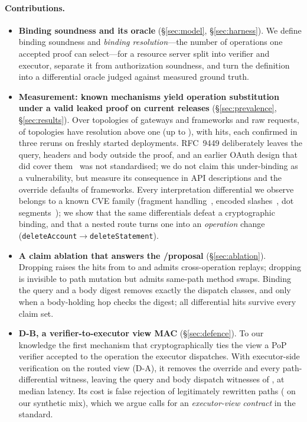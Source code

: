 \paragraph{Contributions.}
\begin{itemize}[leftmargin=*,itemsep=1pt,topsep=2pt]
\item \textbf{Binding soundness and its oracle} (\S\ref{sec:model},
\S\ref{sec:harness}). We define binding soundness and \emph{binding
resolution}---the number of operations one accepted proof can select---for a
resource server split into verifier and executor, separate it from
authorization soundness, and turn the definition into a differential oracle
judged against measured ground truth.
\item \textbf{Measurement: known mechanisms yield operation substitution
under a valid leaked proof on current releases} (\S\ref{sec:prevalence},
\S\ref{sec:results}). Over \NumTopologiesAll{} topologies of \NumGateways{}
gateways and \NumFrameworks{} frameworks and \NumCasesAll{} raw requests,
\NumVulnTopologies{} of \NumTopologies{} topologies have resolution above
one (up to \MaxResolution{}), with \NumHits{} hits, each confirmed in three
reruns on freshly started deployments. RFC~9449 deliberately leaves the query, headers and body outside
the proof, and an earlier OAuth design that did cover
them~\cite{p2:richer2016signedhttp} was not standardised; we do not claim
this under-binding as a vulnerability, but measure its consequence in
\NumSpecs{} API descriptions and the override defaults of
\NumTargetFrameworks{} frameworks. Every interpretation differential we
observe belongs to a known CVE family (fragment handling~\cite{p2:istio2021_008},
encoded slashes~\cite{p2:envoy2021_29492,p2:apisix2026_124680}, dot
segments~\cite{traefik2026cve40912,p2:envoy2026_73551}); we show that the
same differentials defeat a cryptographic binding, and that a nested route
turns one into an \emph{operation} change (\texttt{deleteAccount}$\to$\texttt{deleteStatement}).
\item \textbf{A claim ablation that answers the \htm/\htu proposal}
(\S\ref{sec:ablation}). Dropping \htu raises the hits from
\AblOneHitsFull{} to \AblOneHitsNoHtu{} and admits \AblOneSwapNoHtu{}
cross-operation replays; dropping \htm is invisible to path mutation but
admits \AblOneSwapNoHtm{} same-path method swaps. Binding the query and a
body digest removes exactly the dispatch classes, and only when a
body-holding hop checks the digest; all \AblOneGTwoSurvive{} differential
hits survive every claim set.
\item \textbf{D-B, a verifier-to-executor view MAC} (\S\ref{sec:defence}).
To our knowledge the first mechanism that cryptographically ties the view a
PoP verifier accepted to the operation the executor dispatches. With
executor-side verification on the routed view (D-A), it removes the
override and every path-differential witness, leaving the
\NumDefResidualDB{} query and body dispatch witnesses of \NumDefWitnesses{},
at \DefenceOverheadPfifty{} median latency. Its cost is false rejection of
legitimately rewritten paths (\FRRAllDAB{} on our synthetic mix), which we
argue calls for an \emph{executor-view contract} in the standard.
\end{itemize}

